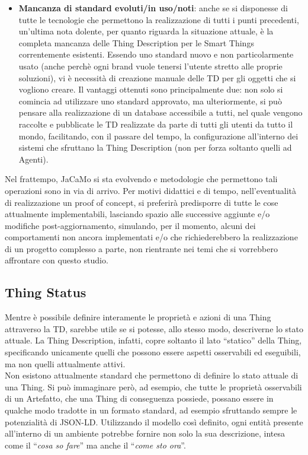 \documentclass[12pt,a4paper,openright,oneside]{report}
\newcommand{\quotes}[1]{``#1''}
\begin{document}
\begin{itemize}
	\item \textbf{Mancanza di standard evoluti/in uso/noti}: anche se si disponesse di tutte le tecnologie che permettono la realizzazione di tutti i punti precedenti, un'ultima nota dolente, per quanto riguarda la situazione attuale, è la completa mancanza delle Thing Description per le Smart Things correntemente esistenti. Essendo uno standard nuovo e non particolarmente usato (anche perchè ogni brand vuole tenersi l'utente stretto alle proprie soluzioni), vi è necessità di creazione manuale delle TD per gli oggetti che si vogliono creare. Il vantaggi ottenuti sono principalmente due: non solo si comincia ad utilizzare uno standard approvato, ma ulteriormente, si può pensare alla realizzazione di un database accessibile a tutti, nel quale vengono raccolte e pubblicate le TD realizzate da parte di tutti gli utenti da tutto il mondo, facilitando, con il passare del tempo, la configurazione all'interno dei sistemi che sfruttano la Thing Description (non per forza soltanto quelli ad Agenti).
\end{itemize}


Nel frattempo, JaCaMo si sta evolvendo e metodologie che permettono tali operazioni sono in via di arrivo. Per motivi didattici e di tempo, nell'eventualità di realizzazione un proof of concept, si preferirà predisporre di tutte le cose attualmente implementabili, lasciando spazio alle successive aggiunte e/o modifiche post-aggiornamento, simulando, per il momento, alcuni dei comportamenti non ancora implementati e/o che richiederebbero la realizzazione di un progetto complesso a parte, non rientrante nei temi che si vorrebbero affrontare con questo studio.

\subsection{Thing Status}
Mentre è possibile definire interamente le proprietà e azioni di una Thing attraverso la TD, sarebbe utile se si potesse, allo stesso modo, descriverne lo stato attuale. La Thing Description, infatti, copre soltanto il lato \quotes{statico} della Thing, specificando unicamente quelli che possono essere aspetti osservabili ed eseguibili, ma non quelli attualmente attivi.\\

Non esistono attualmente standard che permettono di definire lo stato attuale di una Thing. Si può immaginare però, ad esempio, che tutte le proprietà osservabili di un Artefatto, che una Thing di conseguenza possiede, possano essere in qualche modo tradotte in un formato standard, ad esempio sfruttando sempre le potenzialità di JSON-LD. Utilizzando il modello così definito, ogni entità presente all'interno di un ambiente potrebbe fornire non solo la sua descrizione, intesa come il \quotes{\textit{cosa so fare}} ma anche il \quotes{\textit{come sto ora}}.\\
\end{document}
